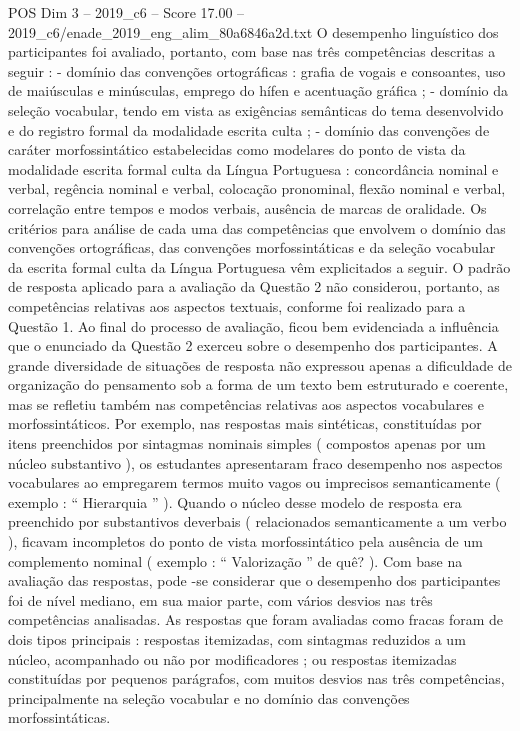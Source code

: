 \begin{textsample}{POS Dim 3 – 2019\_c6 – Score 17.00 – 2019\_c6/enade\_2019\_eng\_alim\_80a6846a2d.txt}
O desempenho linguístico dos participantes foi avaliado, portanto, com base nas três competências descritas a seguir : - domínio das convenções ortográficas : grafia de vogais e consoantes, uso de maiúsculas e minúsculas, emprego do hífen e acentuação gráfica ; - domínio da seleção vocabular, tendo em vista as exigências semânticas do tema desenvolvido e do registro formal da modalidade escrita culta ; - domínio das convenções de caráter morfossintático estabelecidas como modelares do ponto de vista da modalidade escrita formal culta da Língua Portuguesa : concordância nominal e verbal, regência nominal e verbal, colocação pronominal, flexão nominal e verbal, correlação entre tempos e modos verbais, ausência de marcas de oralidade.
Os critérios para análise de cada uma das competências que envolvem o domínio das convenções ortográficas, das convenções morfossintáticas e da seleção vocabular da escrita formal culta da Língua Portuguesa vêm explicitados a seguir.
O padrão de resposta aplicado para a avaliação da Questão 2 não considerou, portanto, as competências relativas aos aspectos textuais, conforme foi realizado para a Questão 1.
Ao final do processo de avaliação, ficou bem evidenciada a influência que o enunciado da Questão 2 exerceu sobre o desempenho dos participantes.
A grande diversidade de situações de resposta não expressou apenas a dificuldade de organização do pensamento sob a forma de um texto bem estruturado e coerente, mas se refletiu também nas competências relativas aos aspectos vocabulares e morfossintáticos.
Por exemplo, nas respostas mais sintéticas, constituídas por itens preenchidos por sintagmas nominais simples ( compostos apenas por um núcleo substantivo ), os estudantes apresentaram fraco desempenho nos aspectos vocabulares ao empregarem termos muito vagos ou imprecisos semanticamente ( exemplo : “ Hierarquia ” ).
Quando o núcleo desse modelo de resposta era preenchido por substantivos deverbais ( relacionados semanticamente a um verbo ), ficavam incompletos do ponto de vista morfossintático pela ausência de um complemento nominal ( exemplo : “ Valorização ” de quê? ).
Com base na avaliação das respostas, pode -se considerar que o desempenho dos participantes foi de nível mediano, em sua maior parte, com vários desvios nas três competências analisadas.
As respostas que foram avaliadas como fracas foram de dois tipos principais : respostas itemizadas, com sintagmas reduzidos a um núcleo, acompanhado ou não por modificadores ; ou respostas itemizadas constituídas por pequenos parágrafos, com muitos desvios nas três competências, principalmente na seleção vocabular e no domínio das convenções morfossintáticas.

\end{textsample}
